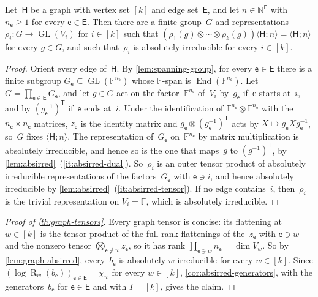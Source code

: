\documentclass[11pt,letterpaper]{article}
\DeclareMathOperator{\tensorrank}{R}
\newcommand{\FF}{\mathbb{F}}
\newcommand{\NN}{\mathbb{N}}
\DeclareMathOperator{\GL}{GL}
\DeclareMathOperator{\End}{End}
\begin{document}
\begin{lemma}\label{lem:graph-absirred}
Let~$\mathsf{H}$ be a graph with vertex set $[k]$ and edge set~$\mathsf{E}$, and let $n \in \NN^\mathsf{E}$ with $n_{\mathsf{e}} \geq 1$ for every $\mathsf{e} \in \mathsf{E}$. Then there are a finite group~$G$ and representations $\rho_i : G \to \GL(V_i)$ for $i \in [k]$ such that $(\rho_1(g) \otimes \cdots \otimes \rho_k(g)) \langle \mathsf{H}; n \rangle = \langle \mathsf{H}; n \rangle$ for every $g \in G$, and such that~$\rho_i$ is absolutely irreducible for every $i \in [k]$.
\end{lemma}
\begin{proof}
Orient every edge of~$\mathsf{H}$. By \cref{lem:spanning-group}, for every $\mathsf{e} \in \mathsf{E}$ there is a finite subgroup $G_{\mathsf{e}} \subseteq \GL(\FF^{n_{\mathsf{e}}})$ whose $\FF$-span is $\End(\FF^{n_{\mathsf{e}}})$. Let $G = \prod_{\mathsf{e} \in \mathsf{E}} G_{\mathsf{e}}$, and let $g \in G$ act on the factor~$\FF^{n_{\mathsf{e}}}$ of~$V_i$ by~$g_{\mathsf{e}}$ if~$\mathsf{e}$ starts at~$i$, and by $(g_{\mathsf{e}}^{-1})^{\mathsf{T}}$ if~$\mathsf{e}$ ends at~$i$. Under the identification of $\FF^{n_{\mathsf{e}}} \otimes \FF^{n_{\mathsf{e}}}$ with the $n_{\mathsf{e}} \times n_{\mathsf{e}}$ matrices, $z_{\mathsf{e}}$ is the identity matrix and $g_{\mathsf{e}} \otimes (g_{\mathsf{e}}^{-1})^{\mathsf{T}}$ acts by $X \mapsto g_{\mathsf{e}} X g_{\mathsf{e}}^{-1}$, so~$G$ fixes $\langle \mathsf{H}; n \rangle$. The representation of~$G_{\mathsf{e}}$ on~$\FF^{n_{\mathsf{e}}}$ by matrix multiplication is absolutely irreducible, and hence so is the one that maps~$g$ to $(g^{-1})^{\mathsf{T}}$, by \cref{lem:absirred}~(\ref{it:absirred-dual}). So~$\rho_i$ is an outer tensor product of absolutely irreducible representations of the factors~$G_{\mathsf{e}}$ with $\mathsf{e} \ni i$, and hence absolutely irreducible by \cref{lem:absirred}~(\ref{it:absirred-tensor}). If no edge contains~$i$, then~$\rho_i$ is the trivial representation on $V_i = \FF$, which is absolutely irreducible.
\end{proof}

\begin{proof}[Proof of \cref{th:graph-tensors}]
Every graph tensor is concise: its flattening at~$w \in [k]$ is the tensor product of the full-rank flattenings of the~$z_{\mathsf{e}}$ with $\mathsf{e} \ni w$ and the nonzero tensor $\bigotimes_{\mathsf{e} \not\ni w} z_{\mathsf{e}}$, so it has rank $\prod_{\mathsf{e} \ni w} n_{\mathsf{e}} = \dim V_w$. So by \cref{lem:graph-absirred}, every~$b_{\mathsf{e}}$ is absolutely $w$-irreducible for every $w \in [k]$. Since $(\log \tensorrank_w(b_{\mathsf{e}}))_{\mathsf{e} \in \mathsf{E}} = \chi_w$ for every $w \in [k]$, \cref{cor:absirred-generators}, with the generators~$b_{\mathsf{e}}$ for $\mathsf{e} \in \mathsf{E}$ and with $I = [k]$, gives the claim.
\end{proof}
\end{document}
